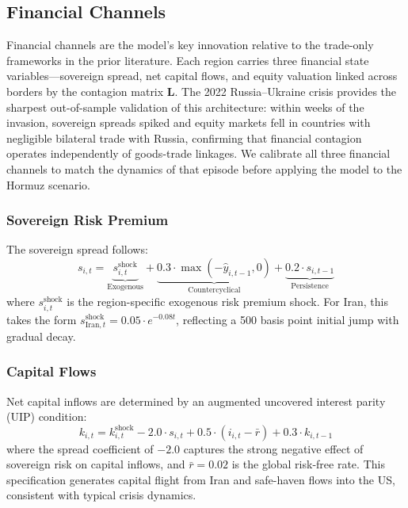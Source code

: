 \documentclass[12pt]{article}
\begin{document}
\subsection{Financial Channels}

Financial channels are the model's key innovation relative to the trade-only frameworks in the prior literature. Each region carries three financial state variables---sovereign spread, net capital flows, and equity valuation linked across borders by the contagion matrix $\mathbf{L}$. The 2022 Russia--Ukraine crisis provides the sharpest out-of-sample validation of this architecture: within weeks of the invasion, sovereign spreads spiked and equity markets fell in countries with negligible bilateral trade with Russia, confirming that financial contagion operates independently of goods-trade linkages. We calibrate all three financial channels to match the dynamics of that episode before applying the model to the Hormuz scenario.

\subsubsection{Sovereign Risk Premium}

The sovereign spread follows:
\begin{equation}
s_{i,t} = \underbrace{s^{\text{shock}}_{i,t}}_{\text{Exogenous}} + \underbrace{0.3 \cdot \max(-\hat{y}_{i,t-1}, 0)}_{\text{Countercyclical}} + \underbrace{0.2 \cdot s_{i,t-1}}_{\text{Persistence}}
\label{eq:spread}
\end{equation}
where $s^{\text{shock}}_{i,t}$ is the region-specific exogenous risk premium shock. For Iran, this takes the form $s^{\text{shock}}_{\text{Iran},t} = 0.05 \cdot e^{-0.08t}$, reflecting a 500 basis point initial jump with gradual decay.

\subsubsection{Capital Flows}

Net capital inflows are determined by an augmented uncovered interest parity (UIP) condition:
\begin{equation}
k_{i,t} = k^{\text{shock}}_{i,t} - 2.0 \cdot s_{i,t} + 0.5 \cdot (i_{i,t} - \bar{r}) + 0.3 \cdot k_{i,t-1}
\label{eq:capital}
\end{equation}
where the spread coefficient of $-2.0$ captures the strong negative effect of sovereign risk on capital inflows, and $\bar{r} = 0.02$ is the global risk-free rate. This specification generates capital flight from Iran and safe-haven flows into the US, consistent with typical crisis dynamics.
\end{document}
